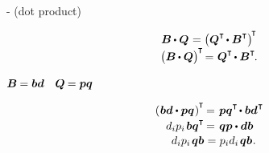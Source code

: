      \hbox{\hspace{-0.2ex}\inquotes{${\dotp\hspace{.22ex}}$}\hspace{-0.2ex}-} (dot product) 

\nopagebreak\vspace{-0.2em}\begin{equation}\label{transposeofdotproductforbivalenttensors}
\begin{array}{c}
\bm{B} \hspace{-0.1ex} \dotp \bm{Q} \hspace{.1ex} = \bigl( \bm{Q}^{\T} \hspace{-0.2ex}\dotp \bm{B}^{\T} \bigr)^{\hspace{-0.25ex}\T}
\\[.1em]
\bigl( \bm{B} \hspace{-0.1ex} \dotp \bm{Q} \bigr)^{\hspace{-0.1ex}\T} \hspace{-0.3ex} = \hspace{.1ex} \bm{Q}^{\T} \hspace{-0.2ex}\dotp \bm{B}^{\T}
\hspace{-0.2ex} .
\end{array}
\end{equation}

{} ${\bm{B} \hspace{-0.1ex} = \bm{b}\bm{d}}$ ~${\bm{Q} \hspace{-0.1ex} = \bm{p}\bm{q}}$

\nopagebreak\vspace{-0.2em}\begin{equation*}
\begin{array}{r@{\hspace{.3em}}c@{\hspace{.3em}}l}
\left(\hspace{.1ex} \bm{b}\bm{d} \dotp \bm{p}\bm{q} \hspace{.1ex}\right)^{\hspace{-0.1ex}\T} & \hspace{-0.5ex} = & \hspace{-0.1ex} \bm{p}\bm{q}^{\T} \hspace{-0.25ex} \dotp \bm{b}\bm{d}^{\hspace{.1ex}\T}
\\[.2em]
d_i p_i \hspace{.25ex} \bm{b}\bm{q}^{\T} & \hspace{-0.5ex} = & \hspace{-0.1ex} \bm{q}\bm{p} \dotp \bm{d} \bm{b}
\\[.1em]
d_i p_i \hspace{.25ex} \bm{q}\bm{b} & = & p_i d_i \hspace{.25ex} \bm{q}\bm{b}
\hspace{.1ex} .
\end{array}
\end{equation*}

